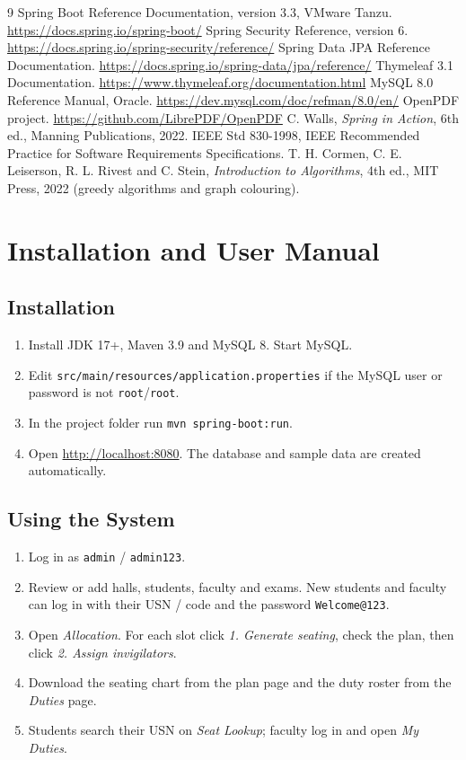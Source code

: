 \documentclass[12pt,a4paper,oneside]{report}
\begin{document}
\begin{thebibliography}{9}
 Spring Boot Reference Documentation, version 3.3, VMware Tanzu. \url{https://docs.spring.io/spring-boot/}
 Spring Security Reference, version 6. \url{https://docs.spring.io/spring-security/reference/}
 Spring Data JPA Reference Documentation. \url{https://docs.spring.io/spring-data/jpa/reference/}
 Thymeleaf 3.1 Documentation. \url{https://www.thymeleaf.org/documentation.html}
 MySQL 8.0 Reference Manual, Oracle. \url{https://dev.mysql.com/doc/refman/8.0/en/}
 OpenPDF project. \url{https://github.com/LibrePDF/OpenPDF}
 C. Walls, \emph{Spring in Action}, 6th ed., Manning Publications, 2022.
 IEEE Std 830-1998, IEEE Recommended Practice for Software Requirements Specifications.
 T. H. Cormen, C. E. Leiserson, R. L. Rivest and C. Stein, \emph{Introduction to Algorithms}, 4th ed., MIT Press, 2022 (greedy algorithms and graph colouring).
\end{thebibliography}

\appendix
\chapter{Installation and User Manual}
\section{Installation}
\begin{enumerate}
  \item Install JDK 17+, Maven 3.9 and MySQL 8. Start MySQL.
  \item Edit \texttt{src/main/resources/application.properties} if the MySQL user or password is not \texttt{root}/\texttt{root}.
  \item In the project folder run \texttt{mvn spring-boot:run}.
  \item Open \url{http://localhost:8080}. The database and sample data are created automatically.
\end{enumerate}
\section{Using the System}
\begin{enumerate}
  \item Log in as \texttt{admin} / \texttt{admin123}.
  \item Review or add halls, students, faculty and exams. New students and faculty can log in with their USN / code and the password \texttt{Welcome@123}.
  \item Open \emph{Allocation}. For each slot click \emph{1. Generate seating}, check the plan, then click \emph{2. Assign invigilators}.
  \item Download the seating chart from the plan page and the duty roster from the \emph{Duties} page.
  \item Students search their USN on \emph{Seat Lookup}; faculty log in and open \emph{My Duties}.
\end{enumerate}
\end{document}
